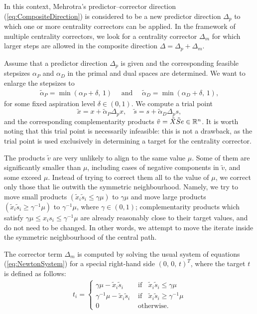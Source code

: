 In this context, Mehrotra's predictor--corrector direction 
(\ref{eq:CompositeDirection}) is considered to be a new predictor direction
$\Delta_p$ to which one or more centrality correctors can be applied. 
In the framework of multiple centrality correctors, we look for a 
centrality corrector $\Delta_m$ for which larger
steps are allowed in the composite direction $\Delta = \Delta_p + \Delta_m$.

Assume that a predictor direction $\Delta_p$ is given and the corresponding
feasible stepsizes $\alpha_{P}$ and $\alpha_{D}$ 
in the primal and dual spaces are determined. 
We want to enlarge the stepsizes to 
%
\begin{eqnarray*} 
   \tilde{\alpha}_{P} = \min(\alpha_{P} \! + \! \delta, \,1) 
   \quad \mbox{ and } \quad
   \tilde{\alpha}_{D} = \min(\alpha_{D} \! + \! \delta, \,1), 
\end{eqnarray*}
%
for some fixed aspiration level $\delta \in(0,1)$. We compute a trial point
%
\[
  \tilde{x} = x + \tilde{\alpha}_{P} \Delta_{p} x, \quad 
  \tilde{s} = s + \tilde{\alpha}_{D} \Delta_{p} s,
\]
%
and the corresponding complementarity products 
$\tilde v = \tilde X \tilde S e \in \mathbb{R}^{n}$.
It is worth noting that this trial point is necessarily infeasible: 
this is not a drawback, as the trial point is used exclusively in
determining a target for the centrality corrector.

The products $\tilde v$ are very unlikely to align to the same value $\mu$.
Some of them are significantly smaller than $\mu$, 
including cases of negative components in $\tilde v$, 
and some exceed $\mu$. Instead of trying to correct 
them all to the value of $\mu$, we correct only those that
lie outwith the symmetric neighbourhood.
Namely, we try to move small products 
$(\tilde x_i \tilde s_i \leq \gamma \mu)$ to $\gamma \mu$ and move 
large products $(\tilde x_i \tilde s_i \geq \gamma^{-1} \mu)$ 
to $\gamma^{-1} \mu$, where $\gamma \in (0,1)$;
complementarity products 
which satisfy $\gamma \mu \leq x_i s_i \leq \gamma^{-1} \mu$ are
already reasonably close to their target values, and 
do not need to be changed. 
In other words, we attempt to move the iterate inside the symmetric
neighbourhood of the central path.

The corrector term $\Delta_m$ is computed by solving the usual 
system of equations (\ref{eq:NewtonSystem}) for a special right-hand side
$(0, \,0,\, t)^T$, where the target $t$ is defined as follows:
%
\begin{eqnarray} \label{eq:Target}
  t_i = \left\{
  \begin{array}{ll}
    \gamma \mu - \tilde x_i \tilde s_i
    & \mbox{ if } \;\; \tilde x_i \tilde s_i \leq \gamma \mu  \\
    \gamma^{-1} \mu - \tilde x_i \tilde s_i
    & \mbox{ if } \;\; \tilde x_i \tilde s_i \geq \gamma^{-1} \mu  \\
    0    
    & \mbox{ otherwise.}
  \end{array}
  \right.
\end{eqnarray}

